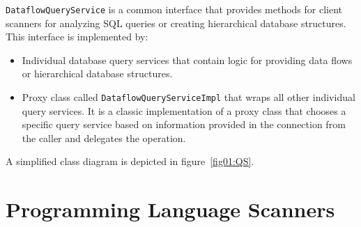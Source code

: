 \texttt{DataflowQueryService} is a common interface that provides methods for client scanners for analyzing SQL queries or creating hierarchical database structures. This interface is implemented by:
\begin{itemize}
    \item Individual database query services that contain logic for providing data flows or hierarchical database structures.
    \item Proxy class called \texttt{DataflowQueryServiceImpl} that wraps all other individual query services. It is a classic implementation of a proxy class that chooses a specific query service based on information provided in the connection from the caller and delegates the operation.    
\end{itemize}

A simplified class diagram is depicted in figure~\ref{fig01:QS}.

\section{Programming Language Scanners}

